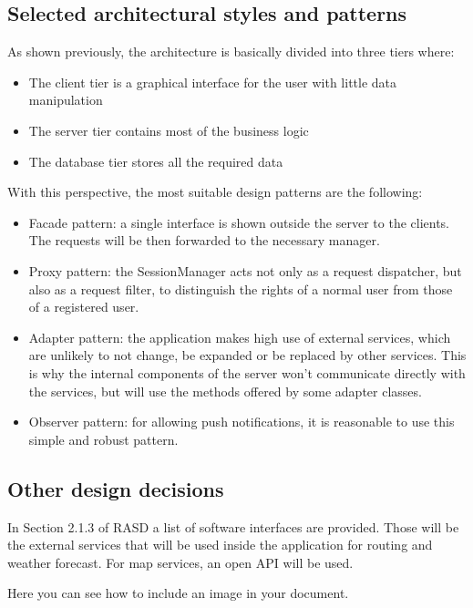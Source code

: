 \subsection{Selected architectural styles and patterns}

As shown previously, the architecture is basically divided into three tiers where:

\begin{itemize}
	\item The client tier is a graphical interface for the user with little data manipulation
	\item The server tier contains most of the business logic
	\item The database tier stores all the required data
\end{itemize}

With this perspective, the most suitable design patterns are the following:
\begin{itemize}
	\item Facade pattern: a single interface is shown outside the server to the clients. The requests will be then forwarded to the necessary manager.
	\item Proxy pattern: the SessionManager acts not only as a request dispatcher, but also as a request filter, to distinguish the rights of a normal user from those of a registered user.
	\item Adapter pattern: the application makes high use of external services, which are unlikely to not change, be expanded or be replaced by other services. This is why the internal components of the server won’t communicate directly with the services, but will use the methods offered by some adapter classes.
	\item Observer pattern: for allowing push notifications, it is reasonable to use this simple and robust pattern.
\end{itemize}

\subsection{Other design decisions}

In Section 2.1.3 of RASD a list of software interfaces are provided. Those will be the external services that will be used inside the application for routing and weather forecast. For map services, an open API will be used.

Here you can see how to include an image in your document.

